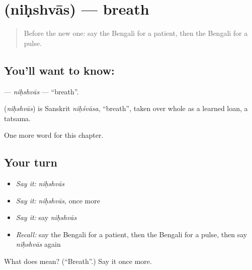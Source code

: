 \section[\texorpdfstring{\bn{নিঃশ্বাস} (niḥshvās)}{নিঃশ্বাস (niḥshvās)}]{ (niḥshvās) — breath}

\label{lesson:BN-C215-nihshvas}



\begin{quote}
Before the new one: say the Bengali for a patient, then the Bengali for a pulse.
\end{quote}

\subsection*{You'll want to know: }
\textbf{} — \emph{niḥshvās} — \textquotedblleft{}breath\textquotedblright{}.

\begin{cousinweb}
\textbf{} (\emph{niḥshvās}) is Sanskrit \emph{niḥśvāsa}, \textquotedblleft{}breath\textquotedblright{}, taken over whole as a learned loan, a tatsama.
\end{cousinweb}

\begin{grammarlens}[title={What you've built}]
One more word for this chapter.
\end{grammarlens}

\subsection*{Your turn}
\begin{itemize}
\raggedright
  \item \emph{Say it:} \emph{niḥshvās}
  \item \emph{Say it:} \emph{niḥshvās}, once more
  \item \emph{Say it:} say \emph{niḥshvās}
  \item \emph{Recall:} say the Bengali for a patient, then the Bengali for a pulse, then say \emph{niḥshvās} again
\end{itemize}

\begin{tcolorbox}[breakable,colback=teal!4,colframe=teal!35!black,title={Before you move on}]
What does  mean? (\textquotedblleft{}Breath\textquotedblright{}.) Say it once more.
\end{tcolorbox}
